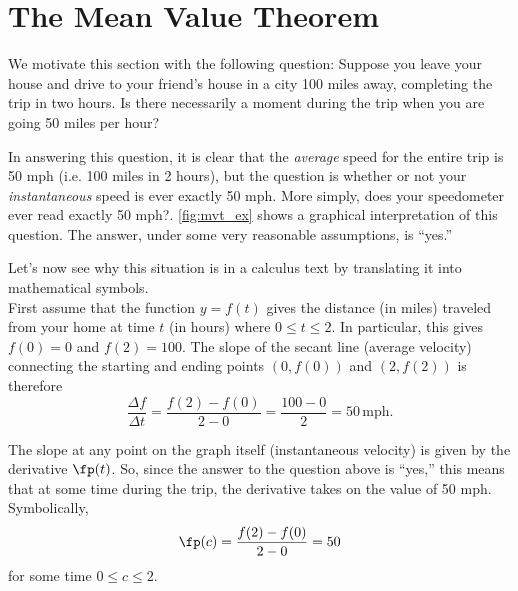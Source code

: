 \section{The Mean Value Theorem}\label{sec:mvt}

We motivate this section with the following question: Suppose you leave your house and drive to your friend's house in a city 100 miles away, completing the trip in two hours.  Is there necessarily a moment during the trip when you are going 50 miles per hour?

In answering this question, it is clear that the \textit{average} speed for the entire trip is 50 mph (i.e. 100 miles in 2 hours), but the question is whether or not your \textit{instantaneous} speed is ever exactly 50 mph. More simply, does your speedometer ever read exactly 50 mph?.  \autoref{fig:mvt_ex} shows a graphical interpretation of this question.  The answer, under some very reasonable assumptions, is ``yes.''


Let's now see why this situation is in a calculus text by translating it into mathematical symbols.\\

First assume that the function $y = f(t)$ gives the distance (in miles) traveled from your home at time $t$ (in hours) where $0\le t\le 2$.  In particular, this gives $f(0)=0$ and $f(2)=100$.  The slope of the secant line (average velocity) connecting the starting and ending points $(0,f(0))$ and $(2,f(2))$ is therefore 
$$
\frac{\Delta f}{\Delta t} = \frac{f(2)-f(0)}{2-0} = \frac{100-0}{2} = 50 \, \text{mph}.
$$

The slope at any point on the graph itself (instantaneous velocity) is given by the derivative $\fp(t)$.  So, since the answer to the question above is ``yes,'' this means that at some time during the trip, the derivative takes on the value of 50 mph.  Symbolically, 
$$
\fp(c) = \frac{f(2)-f(0)}{2-0} = 50
$$
for some time $0\le c \le 2.$\\

